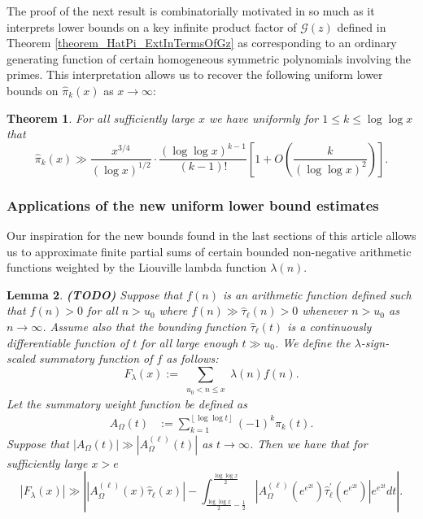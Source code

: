 \documentclass[11pt,reqno,a4letter]{article}
\numberwithin{figure}{section}
\numberwithin{table}{section}
\newcommand{\floor}[1]{\left\lfloor #1 \right\rfloor}
\theoremstyle{plain}
\newtheorem{theorem}{Theorem}
\newtheorem{lemma}[theorem]{Lemma}
\numberwithin{theorem}{section}
\theoremstyle{definition}
\newcommand{\SuccSim}[0]{\overset{_{\scriptsize{\blacktriangle}}}{\succsim}}
\renewcommand{\SuccSim}[0]{\ensuremath{\gg}}
\begin{document}
The proof of the next result is combinatorially motivated in so much as it interprets 
lower bounds on a key infinite product factor of $\mathcal{G}(z)$ defined in 
Theorem \ref{theorem_HatPi_ExtInTermsOfGz} 
as corresponding to an ordinary generating function of certain 
homogeneous symmetric polynomials involving the primes. This interpretation allows us to recover the 
following uniform lower bounds on $\widehat{\pi}_k(x)$ as $x \rightarrow \infty$: 

\begin{theorem} 
\label{theorem_GFs_SymmFuncs_SumsOfRecipOfPowsOfPrimes} 
\label{cor_BoundsOnGz_FromMVBook_initial_stmt_v1} 
For all sufficiently large $x$ we have uniformly for $1 \leq k \leq \log\log x$ that 
\[
\widehat{\pi}_k(x) \gg 
     \frac{x^{3/4}}{(\log x)^{1/2}} \cdot 
     \frac{(\log\log x)^{k-1}}{(k-1)!} \left[1 + 
     O\left(\frac{k}{(\log\log x)^2}\right)\right]. 
\]
\end{theorem} 

\subsubsection{Applications of the new uniform lower bound estimates} 

Our inspiration for the new bounds found in the last sections of this article allows us to 
approximate finite partial sums of certain bounded 
non-negative arithmetic functions weighted by the Liouville lambda function 
$\lambda(n)$. 

\begin{lemma} 
\label{lemma_CLT_and_AbelSummation} 
\textbf{(TODO)} 
Suppose that $f(n)$ is an arithmetic function defined 
such that $f(n) > 0$ for all $n > u_0$ where 
$f(n) \SuccSim \widehat{\tau}_{\ell}(n) > 0$ whenever $n > u_0$ 
as $n \rightarrow \infty$. Assume also that 
the bounding function $\widehat{\tau}_{\ell}(t)$ is a 
continuously differentiable function of $t$ for all 
large enough $t \gg u_0$.  
We define the $\lambda$-sign-scaled summatory function of $f$ as follows: 
\[
F_{\lambda}(x) := \sum_{\substack{u_0 < n \leq x}} \lambda(n) f(n). 
\]
Let the summatory weight function be defined as 
\begin{align*} 
A_{\Omega}(t) & := \sum_{k=1}^{\floor{\log\log t}} (-1)^k \widehat{\pi}_k(t). 
\end{align*} 
Suppose that $|A_{\Omega}(t)| \gg |A_{\Omega}^{(\ell)}(t)|$ as $t \rightarrow \infty$. 
Then we have that for sufficiently large $x > e$ 
\begin{equation} 
\label{eqn_Flambdax_RHA_AbelSummationFormula_v1} 
|F_{\lambda}(x)| \SuccSim \left\lvert 
     \left\lvert A_{\Omega}^{(\ell)}(x) \widehat{\tau}_{\ell}(x) \right\rvert - 
     \int_{\frac{\log\log x}{2} - \frac{1}{2}}^{\frac{\log\log x}{2}} 
     \left\lvert A_{\Omega}^{(\ell)}\left(e^{e^{2t}}\right) 
     \widehat{\tau}_{\ell}^{\prime}\left(e^{e^{2t}}\right) 
     \right\rvert e^{e^{2t}} dt 
     \right\rvert.  
\end{equation} 
\end{lemma} 
\end{document}
